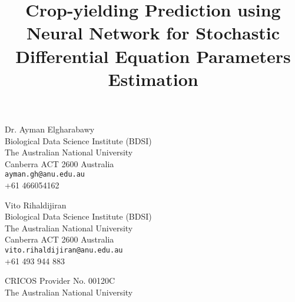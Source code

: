 \documentclass[12pt]{article}
\title{Crop-yielding Prediction using Neural Network for Stochastic Differential Equation Parameters Estimation}
\date{}
\begin{document}
\maketitle

\begin{center}
    \begin{minipage}{0.4\textwidth}
        \begin{center}
            Dr. Ayman Elgharabawy \\
            Biological Data Science Institute (BDSI) \\
            The Australian National University \\
            Canberra ACT 2600 Australia \\
            \texttt{ayman.gh@anu.edu.au} \\
            +61 466054162 
        \end{center}
    \end{minipage}
    \hfill
    \begin{minipage}{0.4\textwidth}
        \begin{center}
            Vito Rihaldijiran \\
            Biological Data Science Institute (BDSI) \\
            The Australian National University \\
            Canberra ACT 2600 Australia \\
            \texttt{vito.rihaldijiran@anu.edu.au} \\
            +61 493 944 883
        \end{center}
    \end{minipage}
\end{center}






\newpage





\vfill
\noindent CRICOS Provider No. 00120C \\
The Australian National University
\end{document}

